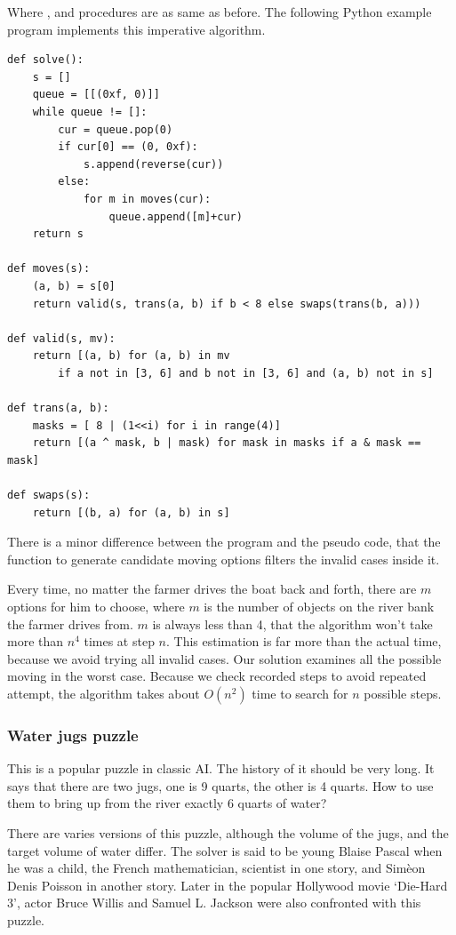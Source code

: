 \documentclass[UTF8]{article}
\begin{document}
Where , and  procedures are as
same as before. The following Python example program implements
this imperative algorithm.

\lstset{language=Python}
\begin{lstlisting}
def solve():
    s = []
    queue = [[(0xf, 0)]]
    while queue != []:
        cur = queue.pop(0)
        if cur[0] == (0, 0xf):
            s.append(reverse(cur))
        else:
            for m in moves(cur):
                queue.append([m]+cur)
    return s

def moves(s):
    (a, b) = s[0]
    return valid(s, trans(a, b) if b < 8 else swaps(trans(b, a)))

def valid(s, mv):
    return [(a, b) for (a, b) in mv
        if a not in [3, 6] and b not in [3, 6] and (a, b) not in s]

def trans(a, b):
    masks = [ 8 | (1<<i) for i in range(4)]
    return [(a ^ mask, b | mask) for mask in masks if a & mask == mask]

def swaps(s):
    return [(b, a) for (a, b) in s]
\end{lstlisting}

There is a minor difference between the program and the pseudo code, that the function
to generate candidate moving options filters the invalid cases inside it.

Every time, no matter the farmer drives the boat back and forth, there are
$m$ options for him to choose, where $m$ is the number of objects on the
river bank the farmer drives from. $m$ is always less than 4, that the
algorithm won't take more than $n^4$ times at step $n$. This estimation
is far more than the actual time, because we avoid trying all invalid
cases. Our solution examines all the possible moving in the worst case.
Because we check recorded steps to avoid repeated attempt, the
algorithm takes about $O(n^2)$ time to search for $n$ possible steps.

\subsubsection{Water jugs puzzle}
This is a popular puzzle in classic AI. The history of it should be very long.
It says that there are two jugs, one is 9 quarts, the other is 4 quarts.
How to use them to bring up from the river exactly 6 quarts of water?

There are varies versions of this puzzle, although the volume
of the jugs, and the target volume of water differ. The solver is said to
be young Blaise Pascal when he was a child, the French mathematician,
scientist in one story, and Sim\`{e}on Denis Poisson in another story.
Later in the popular Hollywood movie `Die-Hard 3', actor Bruce Willis
and Samuel L. Jackson were also confronted with this puzzle.
\end{document}
